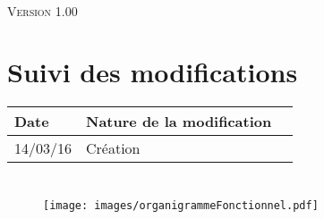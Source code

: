 \documentclass[asi, sansVersion]{picInsa}
\begin{document}
	\begin{center}
		\LARGE
		\textsc{
			\OF{}\\
			Version 1.00
		}
	\end{center}
	\vspace{0.5cm}

	\section*{Suivi des modifications}
		\begin{table}[H]
			\centering
			\begin{tabularx}{18cm}{|p{1.7cm}|X|p{4cm}|}
				\hline
				\rowcolor[gray]{0.90} Date & Nature de la modification \\
				\hline
				
				14/03/16 & Création \\
				\hline
			\end{tabularx}
		\end{table}

	\section*{\OF}
		\begin{figure}[h]
				\texttt{[image: images/organigrammeFonctionnel.pdf]}
		\end{figure}
\end{document}
